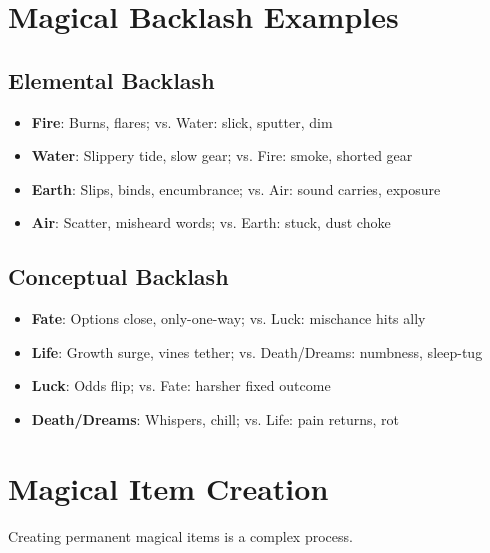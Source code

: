 \section{Magical Backlash Examples} 

\subsection*{Elemental Backlash}
\begin{itemize}
\item \textbf{Fire}: Burns, flares; vs. Water: slick, sputter, dim
\item \textbf{Water}: Slippery tide, slow gear; vs. Fire: smoke, shorted gear
\item \textbf{Earth}: Slips, binds, encumbrance; vs. Air: sound carries, exposure
\item \textbf{Air}: Scatter, misheard words; vs. Earth: stuck, dust choke
\end{itemize}

\subsection*{Conceptual Backlash}
\begin{itemize}
\item \textbf{Fate}: Options close, only-one-way; vs. Luck: mischance hits ally
\item \textbf{Life}: Growth surge, vines tether; vs. Death/Dreams: numbness, sleep-tug
\item \textbf{Luck}: Odds flip; vs. Fate: harsher fixed outcome
\item \textbf{Death/Dreams}: Whispers, chill; vs. Life: pain returns, rot
\end{itemize}

\section{Magical Item Creation} 

Creating permanent magical items is a complex process.

